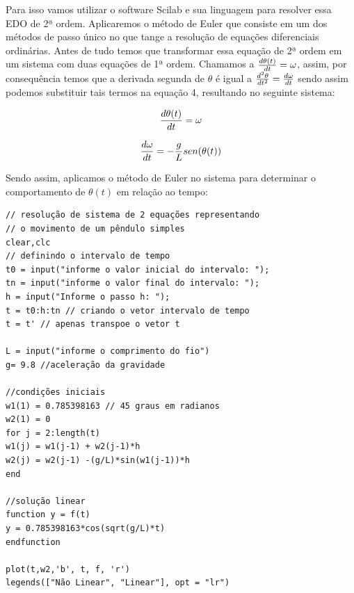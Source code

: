 Para isso vamos utilizar o software Scilab e sua linguagem para resolver essa EDO de 2ª ordem. Aplicaremos o método de Euler que consiste em um dos métodos de passo único no que tange a resolução de equações diferenciais ordinárias. Antes de tudo temos que transformar essa equação de 2ª ordem em um sistema com duas equações de 1ª ordem. Chamamos a $\large \frac{d\theta(t)}{dt} = \omega$, assim, por consequência temos que a derivada segunda de $\theta$ é igual a $\large \frac{d^2\theta}{dt^2} = \frac{d\omega}{dt}$ sendo assim podemos substituir tais termos na equação 4, resultando no seguinte sistema:

$$\Large \frac{d\theta(t)}{dt} = \omega$$

$$\Large \frac{d\omega}{dt} = -\frac{g}{L} sen(\theta(t))$$

Sendo assim, aplicamos o método de Euler no sistema para determinar o comportamento de $\theta(t)$ em relação ao tempo:

\begin{verbatim}
// resolução de sistema de 2 equações representando 
// o movimento de um pêndulo simples
clear,clc
// definindo o intervalo de tempo
t0 = input("informe o valor inicial do intervalo: ");
tn = input("informe o valor final do intervalo: ");
h = input("Informe o passo h: ");
t = t0:h:tn // criando o vetor intervalo de tempo
t = t' // apenas transpoe o vetor t

L = input("informe o comprimento do fio")
g= 9.8 //aceleração da gravidade

//condições iniciais
w1(1) = 0.785398163 // 45 graus em radianos
w2(1) = 0
for j = 2:length(t)
w1(j) = w1(j-1) + w2(j-1)*h
w2(j) = w2(j-1) -(g/L)*sin(w1(j-1))*h
end

//solução linear 
function y = f(t)
y = 0.785398163*cos(sqrt(g/L)*t)
endfunction

plot(t,w2,'b', t, f, 'r')
legends(["Não Linear", "Linear"], opt = "lr")
\end{verbatim}